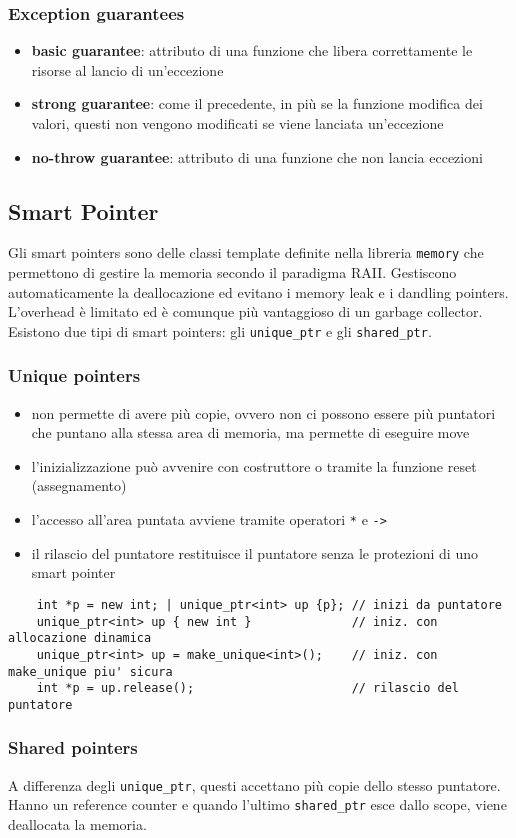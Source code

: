 \documentclass[a4paper]{article}
\begin{document}
\subsubsection*{Exception guarantees}
\begin{itemize}
	\item \textbf{basic guarantee}: attributo di una funzione che libera correttamente le risorse al lancio di un'eccezione
	\item \textbf{strong guarantee}: come il precedente, in più se la funzione modifica dei valori, questi non vengono modificati
	se viene lanciata un'eccezione
	\item \textbf{no-throw guarantee}: attributo di una funzione che non lancia eccezioni
\end{itemize}

\subsection{Smart Pointer}
Gli smart pointers sono delle classi template definite nella libreria \verb|memory| che permettono di gestire la memoria secondo
il paradigma RAII. Gestiscono automaticamente la deallocazione ed evitano i memory leak e i dandling pointers. L'overhead è
limitato ed è comunque più vantaggioso di un garbage collector. Esistono due tipi di smart pointers: gli \verb|unique_ptr| e
gli \verb|shared_ptr|.

\subsubsection*{Unique pointers}
\begin{itemize}
	\item non permette di avere più copie, ovvero non ci possono essere più puntatori che puntano alla stessa area di memoria, 
	ma permette di eseguire move
	\item l'inizializzazione può avvenire con costruttore o tramite la funzione reset (assegnamento)
	\item l'accesso all'area puntata avviene tramite operatori \verb|*| e \verb|->|
	\item il rilascio del puntatore restituisce il puntatore senza le protezioni di uno smart pointer
\end{itemize}
\begin{lstlisting}
	int *p = new int; | unique_ptr<int> up {p}; // inizi da puntatore
	unique_ptr<int> up { new int }              // iniz. con allocazione dinamica
	unique_ptr<int> up = make_unique<int>();    // iniz. con make_unique piu' sicura
	int *p = up.release();                      // rilascio del puntatore
\end{lstlisting}

\subsubsection*{Shared pointers}
A differenza degli \verb|unique_ptr|, questi accettano più copie dello stesso puntatore. Hanno un reference counter e quando l'ultimo
\verb|shared_ptr| esce dallo scope, viene deallocata la memoria.
\end{document}
